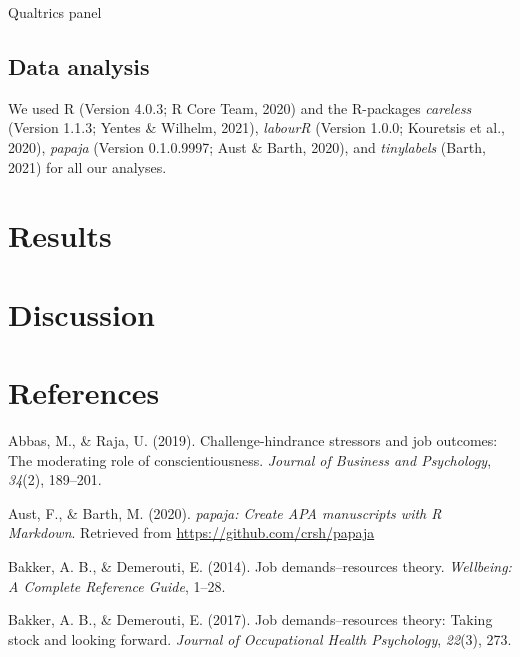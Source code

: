 \documentclass[
  english,
  man]{apa6}
\begin{document}
Qualtrics panel

\hypertarget{data-analysis}{%
\subsection{Data analysis}\label{data-analysis}}

We used R (Version 4.0.3; R Core Team, 2020) and the R-packages \emph{careless} (Version 1.1.3; Yentes \& Wilhelm, 2021), \emph{labourR} (Version 1.0.0; Kouretsis et al., 2020), \emph{papaja} (Version 0.1.0.9997; Aust \& Barth, 2020), and \emph{tinylabels} (Barth, 2021) for all our analyses.

\hypertarget{results-1}{%
\section{Results}\label{results-1}}

\hypertarget{discussion-1}{%
\section{Discussion}\label{discussion-1}}

\newpage

\hypertarget{references}{%
\section{References}\label{references}}

\begingroup
\setlength{\parindent}{-0.5in}
\setlength{\leftskip}{0.5in}

\hypertarget{refs}{}
\leavevmode\hypertarget{ref-abbas2019challenge}{}%
Abbas, M., \& Raja, U. (2019). Challenge-hindrance stressors and job outcomes: The moderating role of conscientiousness. \emph{Journal of Business and Psychology}, \emph{34}(2), 189--201.

\leavevmode\hypertarget{ref-R-papaja}{}%
Aust, F., \& Barth, M. (2020). \emph{papaja: Create APA manuscripts with R Markdown}. Retrieved from \url{https://github.com/crsh/papaja}

\leavevmode\hypertarget{ref-bakker2014job}{}%
Bakker, A. B., \& Demerouti, E. (2014). Job demands--resources theory. \emph{Wellbeing: A Complete Reference Guide}, 1--28.

\leavevmode\hypertarget{ref-bakker2017job}{}%
Bakker, A. B., \& Demerouti, E. (2017). Job demands--resources theory: Taking stock and looking forward. \emph{Journal of Occupational Health Psychology}, \emph{22}(3), 273.
\end{document}
